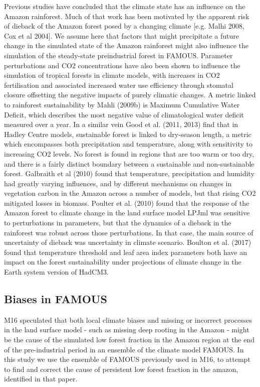 \documentclass[gmd, manuscript]{copernicus}
\begin{document}
Previous studies have concluded that the climate state has an influence on the Amazon rainforest. Much of that work has been motivated by the apparent risk of dieback of the Amazon forest posed by a changing climate [e.g. Malhi 2008, Cox et al 2004].  We assume here that factors that might precipitate a future change in the simulated state of the Amazon rainforest might also influence the simulation of the steady-state preindustrial forest in FAMOUS. Parameter perturbations and CO2 concentrations have also been shown to influence the simulation of tropical forests in climate models, with increases in CO2 fertilisation and associated increased water use efficiency through stomatal closure offsetting the negative impacts of purely climatic changes. A metric linked to rainforest sustainability by Mahli (2009b) is Maximum Cumulative Water Deficit, which describes the most negative value of climatological water deficit measured over a year. In a similar vein Good et al. (2011, 2013) find that in Hadley Centre models, sustainable forest is linked to dry-season length, a metric which encompasses both precipitation and temperature, along with sensitivity to increasing CO2 levels. No forest is found in regions that are too warm or too dry, and there is a fairly distinct boundary between a sustainable and non-sustainable forest. Galbraith et al (2010) found that temperature, precipitation and humidity had greatly varying influences, and by different mechanisms on changes in vegetation carbon in the Amazon across a number of models, but that rising CO2 mitigated losses in biomass. Poulter et al. (2010) found that the response of the Amazon forest to climate change in the land surface model LPJml was sensitive to perturbations in parameters, but that the dynamics of a dieback in the rainforest was robust across those perturbations. In that case, the main source of uncertainty of dieback was uncertainty in climate scenario. Boulton et al. (2017) found that temperature threshold and leaf area index parameters both have an impact on the forest sustainability under projections of climate change in the Earth system version of HadCM3.

\subsection{Biases in FAMOUS}

M16 speculated that both local climate biases and missing or incorrect processes in the land surface model - such as missing deep rooting in the Amazon - might be the cause of the simulated low forest fraction in the Amazon region at the end of the pre-industrial period in an ensemble of the climate model FAMOUS. In this study we use the ensemble of FAMOUS previously used in M16, to attempt to find and correct the cause of persistent low forest fraction in the amazon, identified in that paper. 
\end{document}
